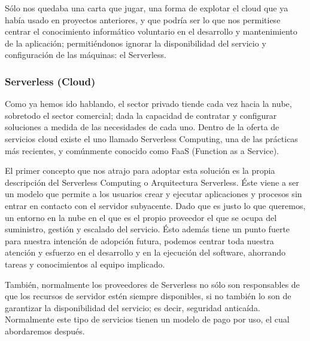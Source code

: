 \vspace{1em}
\par Sólo nos quedaba una carta que jugar, una forma de explotar el cloud que ya había usado en proyectos anteriores, y que podría ser lo que nos permitiese centrar el conocimiento informático voluntario en el desarrollo y mantenimiento de la aplicación; permitiéndonos ignorar la disponibilidad del servicio y configuración de las máquinas: el Serverless.
\clearpage
\subsubsection{Serverless (Cloud)}
Como ya hemos ido hablando, el sector privado tiende cada vez hacia la nube, sobretodo el sector comercial; dada la capacidad de contratar y configurar soluciones a medida de las necesidades de cada uno. Dentro de la oferta de servicios cloud existe el uno llamado Serverless Computing, una de las prácticas más recientes, y comúnmente conocido como FaaS (Function as a Service).
\vspace{1em}
\par El primer concepto que nos atrajo para adoptar esta solución es la propia descripción del Serverless Computing o Arquitectura Serverless. Éste viene a ser un modelo que permite a los usuarios crear y ejecutar aplicaciones y procesos sin entrar en contacto con el servidor subyacente. Dado que es justo lo que queremos, un entorno en la nube en el que es el propio proveedor el que se ocupa del suministro, gestión y escalado del servicio. Ésto además tiene un punto fuerte para nuestra intención de adopción futura, podemos centrar toda nuestra atención y esfuerzo en el desarrollo y en la ejecución del software, ahorrando tareas y conocimientos al equipo implicado.
\vspace{1em}
\par También, normalmente los proveedores de Serverless no sólo son responsables de que los recursos de servidor estén siempre disponibles, si no también lo son de garantizar la disponibilidad del servicio; es decir, seguridad anticaída. Normalmente este tipo de servicios tienen un modelo de pago por uso, el cual abordaremos después.
